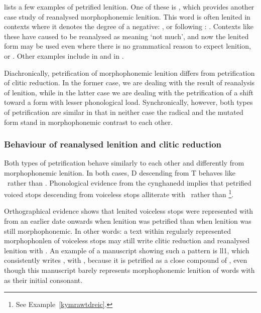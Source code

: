 \Textcite[448-451]{morgan_y_1952} lists a few examples of petrified lenition. One of these is , which provides another case study of reanalysed morphophonemic lenition. This word is often lenited in contexts where it denotes the degree of a negative: \eg {}, or following \oes: . Contexts like these have caused  to be reanalysed as meaning `not much', and now the lenited form may be used even where there is no grammatical reason to expect lenition, \eg {} or . Other examples include  in  and  in .

Diachronically, petrification of morphophonemic lenition differs from petrification of clitic reduction. 
In the former case, we are dealing with the result of reanalysis of lenition, while in the latter case we are dealing with the petrification of a shift toward a form with lesser phonological load. 
Synchronically, however, both types of petrification are similar in that in neither case the radical and the mutated form stand in morphophonemic contrast to each other. 

\subsubsection{Behaviour of reanalysed lenition and clitic reduction}
\label{sec:their-behaviour}
Both types of petrification behave similarly to each other and differently from morphophonemic lenition. 
In both cases, \gls{D} descending from \gls{T} behaves like \xD\ rather than \lT. Phonological evidence from the cynghanedd implies that petrified voiced stops descending from voiceless stops alliterate with \xD\ rather than \lT\footnote{See Example~\ref{kymrawtdreic}.}.

Orthographical evidence shows that lenited voiceless stops were represented with  from an earlier date onwards when lenition was petrified than when lenition was still morphophonemic. 
In other words: a text within regularly represented \gls{morphophonlen} of voiceless stops may still write clitic reduction and reanalysed lenition with . 
An example of a manuscript showing such a pattern is \gls{ll1}, which consistently writes , with , because it is petrified as a close compound of , even though this manuscript barely represents morphophonemic lenition of words with  as their initial consonant.

